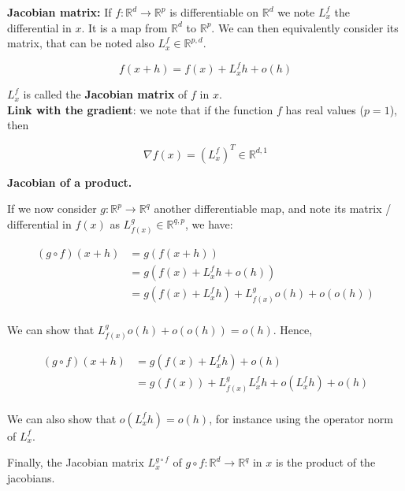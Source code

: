 \documentclass[
10pt, %
a4paper, %
oneside, %
headinclude,footinclude, %
BCOR5mm, %
]{scrartcl}
\begin{document}
\textbf{{Jacobian matrix:}} If $f: \mathbb{R}^d\rightarrow \mathbb{R}^p$ is differentiable on $ \mathbb{R}^d$ we note $L^f_x$ the differential in $x$. It is a map from $ \mathbb{R}^d$ to $ \mathbb{R}^p$. We can then equivalently consider its matrix, that can be noted also $L^f_x\in \mathbb{R}^{p, d}$. 

\begin{equation*}
    f(x+h)=f(x)+L^f_xh+o(h)
\end{equation*}

$L^f_x$ is called the \textbf{{Jacobian matrix}}  of $f$ in $x$.
\\

\textbf{{Link with the gradient}}: we note that if the function $f$ has real values ($p=1$), then 

\begin{equation*}
    \nabla f(x)=(L^f_x)^T\in \mathbb{R}^{d, 1}
\end{equation*}

\textbf{{Jacobian of a product.}} 

If we now consider $g: \mathbb{R}^p\rightarrow \mathbb{R}^q$ another differentiable map, and note its matrix / differential in $f(x)$ as $L^g_{f(x)}\in \mathbb{R}^{q, p}$, we have:

\begin{equation*}
    \begin{aligned}
	(g\circ f)(x+h)&=g(f(x+h))\\
	&=g(f(x)+L^f_xh+o(h))\\
	&=g(f(x)+L^f_xh)+L^g_{f(x)}o(h)+o(o(h))\\
    \end{aligned}
\end{equation*}

We can show that $L^g_{f(x)}o(h)+o(o(h))=o(h)$. Hence, 

\begin{equation*}
    \begin{aligned}
	(g\circ f)(x+h)&=g(f(x)+L^f_xh)+o(h)\\
	&=g(f(x))+L^g_{f(x)}L^f_xh+o(L^f_xh)+o(h)\\
    \end{aligned}
\end{equation*}

We can also show that $o(L^f_xh)=o(h)$, for instance using the operator norm of $L^f_x$.

Finally, the Jacobian matrix $L^{g\circ f}_x$ of $g\circ f: \mathbb{R}^d\rightarrow \mathbb{R}^q$ in $x$ is the product of the jacobians.
\end{document}
